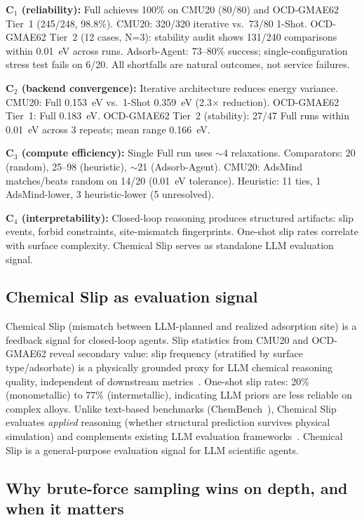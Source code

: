 \textbf{C$_1$ (reliability):} Full achieves 100\% on CMU20 (80/80) and OCD-GMAE62 Tier~1 (245/248, 98.8\%).
CMU20: 320/320 iterative vs.\ 73/80 1-Shot.
OCD-GMAE62 Tier~2 (12 cases, N=3): stability audit shows 131/240 comparisons within 0.01~eV across runs.
Adsorb-Agent: 73--80\% success; single-configuration stress test fails on 6/20.
All shortfalls are natural outcomes, not service failures.

\textbf{C$_2$ (backend convergence):} Iterative architecture reduces energy variance.
CMU20: Full 0.153~eV vs.\ 1-Shot 0.359~eV (2.3$\times$ reduction).
OCD-GMAE62 Tier~1: Full 0.183~eV.
OCD-GMAE62 Tier~2 (stability): 27/47 Full runs within 0.01~eV across 3 repeats; mean range 0.166~eV.

\textbf{C$_3$ (compute efficiency):} Single Full run uses $\sim$4 relaxations.
Comparators: 20 (random), 25--98 (heuristic), $\sim$21 (Adsorb-Agent).
CMU20: AdsMind matches/beats random on 14/20 (0.01~eV tolerance).
Heuristic: 11 ties, 1 AdsMind-lower, 3 heuristic-lower (5 unresolved).

\textbf{C$_4$ (interpretability):} Closed-loop reasoning produces structured artifacts:
slip events, forbid constraints, site-mismatch fingerprints.
One-shot slip rates correlate with surface complexity.
Chemical Slip serves as standalone LLM evaluation signal.


\subsection{Chemical Slip as evaluation signal}

Chemical Slip (mismatch between LLM-planned and realized adsorption site) is a feedback signal for closed-loop agents.
Slip statistics from CMU20 and OCD-GMAE62 reveal secondary value: slip frequency (stratified by surface type/adsorbate) is a physically grounded proxy for LLM chemical reasoning quality, independent of downstream metrics~\cite{alfred2026data,zhang2026towards}.
One-shot slip rates: 20\% (monometallic) to 77\% (intermetallic), indicating LLM priors are less reliable on complex alloys.
Unlike text-based benchmarks (ChemBench~\cite{mirza2024chembench}), Chemical Slip evaluates \textit{applied} reasoning (whether structural prediction survives physical simulation) and complements existing LLM evaluation frameworks~\cite{li2026agentic,huang2026towards}.
Chemical Slip is a general-purpose evaluation signal for LLM scientific agents.

\subsection{Why brute-force sampling wins on depth, and when it matters}

